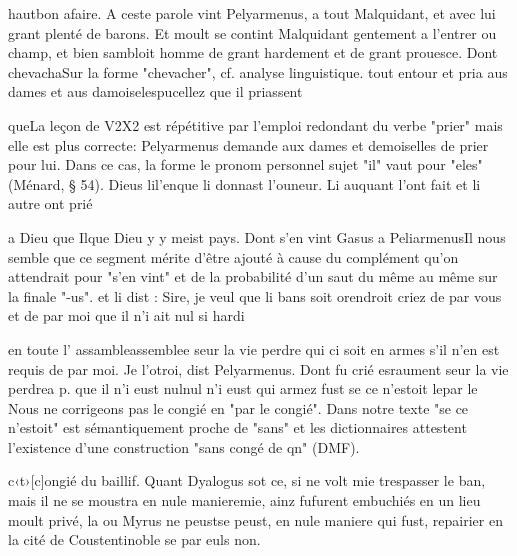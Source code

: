 \documentclass{article}
\begin{document}
\begin{pages}
                        hautbon afaire. \pend
            \pstart A ceste parole vint Pelyarmenus, a tout Malquidant, 
                  et avec lui grant plenté de barons. Et moult se contint Malquidant gentement a l’entrer ou champ, et bien sambloit homme de
               grant hardement et de grant prouesce. Dont chevachaSur la
                  forme "chevacher", cf. analyse linguistique. tout entour et pria
               aus dames et aus 
                  damoiselespucellez que 
                  il priassent 

                        queLa leçon de V2X2 est répétitive par l'emploi
                  redondant du verbe "prier" mais elle est plus correcte: Pelyarmenus demande aux
                  dames et demoiselles de prier pour lui. Dans ce cas, la forme le pronom personnel
                  sujet "il" vaut pour "eles" (Ménard, § 54).  Dieus 
                  lil'enque li donnast l’ouneur. 
                  Li auquant l’ont fait et li autre 
                  ont prié
               
                  a Dieu que Ilque Dieu y
               y meist pays. Dont s’en vint Gasus
               a PeliarmenusIl nous
                  semble que ce segment mérite d'être ajouté à cause du complément qu'on attendrait
                  pour "s'en vint" et de la probabilité d'un saut du même au même sur la finale
                  "-us". et li dist : Sire, je veul que li
                  bans soit 
                     orendroit criez de par vous et de par moi que il n’i ait nul si hardi 
                     
                           en toute l’
                                 assambleassemblee seur la vie perdre qui ci soit en armes s’il n’en est requis de par
                  moi.
               Je l’otroi, dist Pelyarmenus. Dont fu crié 
                  esraument seur la vie 
                  perdrea p. que 
                     il n’i eust nulnul n'i eust qui armez fust se ce n’estoit 
                     lepar le
                     Nous ne corrigeons pas le
                           congié en "par le congié". Dans notre texte "se ce n'estoit" est
                        sémantiquement proche de "sans" et les dictionnaires attestent l'existence
                        d'une construction "sans congé de qn" (DMF).
                  
                  
                     c‹t›[c]ongié du baillif. Quant Dyalogus sot ce, si ne volt mie trespasser le ban, mais
               il ne se moustra 
                  en nule manieremie, ainz 
                  fufurent embuchiés en un lieu 
                  moult privé, la ou Myrus ne 
                  peustse peust, 
                  en nule maniere qui fust, repairier en la cité 
                  de Coustentinoble se par euls non. \pend
         

\end{pages}
\end{document}
